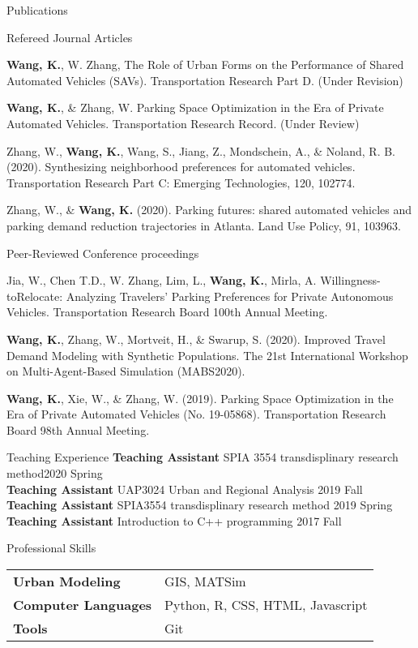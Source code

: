 \documentclass{resume} %
\begin{document}
\begin{rSection}{Publications}


\begin{rSubSection}{Refereed Journal Articles}

{\bf Wang, K.}, W. Zhang, The Role of Urban Forms on the Performance of Shared Automated Vehicles (SAVs). Transportation Research Part D. (Under Revision)

{\bf Wang, K.}, \& Zhang, W. Parking Space Optimization in the Era of Private Automated Vehicles. Transportation Research Record. (Under Review)

Zhang, W., {\bf Wang, K.}, Wang, S., Jiang, Z., Mondschein, A., \& Noland, R. B. (2020). Synthesizing neighborhood preferences for automated vehicles. Transportation Research Part C: Emerging Technologies, 120, 102774.

Zhang, W., \& {\bf Wang, K.} (2020). Parking futures: shared automated vehicles and parking demand reduction trajectories in Atlanta. Land Use Policy, 91, 103963.

\end{rSubSection}


\begin{rSubSection}{Peer-Reviewed Conference proceedings}

Jia, W., Chen T.D., W. Zhang, Lim, L., {\bf Wang, K.}, Mirla, A. Willingness-toRelocate: Analyzing Travelers' Parking Preferences for Private Autonomous Vehicles. Transportation Research Board 100th Annual Meeting.

{\bf Wang, K.}, Zhang, W., Mortveit, H., \& Swarup, S. (2020). Improved Travel Demand Modeling with Synthetic Populations. The 21st International Workshop on Multi-Agent-Based Simulation (MABS2020).

{\bf Wang, K.}, Xie, W., \& Zhang, W. (2019). Parking Space Optimization in the Era of Private Automated Vehicles (No. 19-05868). Transportation Research Board 98th Annual Meeting.


\end{rSubSection}

\end{rSection}


\begin{rSection}{Teaching Experience}
{\bf Teaching Assistant} SPIA 3554 transdisplinary research method\hfill {2020 Spring}\\
{\bf Teaching Assistant} UAP3024 Urban and Regional Analysis \hfill {2019 Fall}\\
{\bf Teaching Assistant} SPIA3554 transdisplinary research method \hfill {2019 Spring}\\
{\bf Teaching Assistant} Introduction to C++ programming \hfill {2017 Fall}\\

\end{rSection}

\begin{rSection}{Professional Skills}
\begin{tabular}{ @{} >{\bfseries}l @{\hspace{6ex}} l }
Urban Modeling & GIS, MATSim\\
Computer Languages & Python, R, CSS, HTML, Javascript \\
Tools & Git\\
\end{tabular}
\end{rSection}
\end{document}

